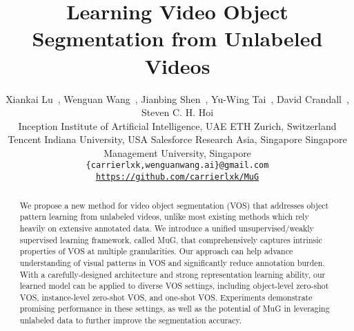 \documentclass[10pt,twocolumn,letterpaper]{article}
\begin{document}
\title{Learning Video Object Segmentation from Unlabeled Videos}

\author{Xiankai Lu~\!,\hspace{1pt} Wenguan Wang~\!, \hspace{1pt} Jianbing Shen~\!, \hspace{1pt}  Yu-Wing Tai~\!,\hspace{1pt}  David Crandall~\!, \hspace{1pt} Steven C. H. Hoi  \\
	\small{} \small Inception Institute of Artificial Intelligence, UAE \hspace{2pt} \small{} \small ETH Zurich, Switzerland \hspace{0pt} \\
	\small{} \small Tencent \hspace{3pt}	\small{} \small Indiana University, USA \hspace{3pt} \small{} \small  Salesforce Research Asia, Singapore \small{} \small  Singapore Management University, Singapore\\
	{\tt\small \{carrierlxk,wenguanwang.ai\}@gmail.com}\\
	{\tt\small \url{https://github.com/carrierlxk/MuG}}
}

\maketitle


\begin{abstract}
We propose a new method for video object segmentation (VOS) that addresses object pattern learning from
unlabeled videos, unlike most existing methods which rely heavily on extensive annotated data.  We introduce a unified unsupervised/weakly supervised learning framework, called MuG, that comprehensively captures intrinsic properties of VOS at multiple granularities. Our approach can help advance understanding of visual patterns in VOS and significantly reduce annotation burden. With a carefully-designed architecture and strong representation learning ability, our learned
model can be applied to diverse VOS settings, including object-level zero-shot VOS, instance-level zero-shot VOS, and one-shot VOS. Experiments demonstrate promising performance in these settings,
as well as the potential of MuG in leveraging unlabeled data to further improve the segmentation accuracy. \end{abstract}
\vspace*{-3pt}
\end{document}
